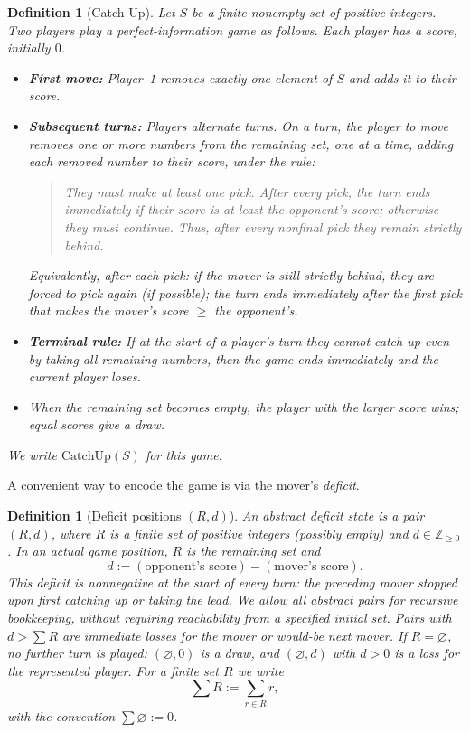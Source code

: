 \documentclass[11pt]{article}
\newtheorem{definition}[theorem]{Definition}
\newcommand{\CatchUp}{\mathrm{CatchUp}}
\begin{document}
\begin{definition}[Catch-Up]\label{def:catchup}
Let $S$ be a finite nonempty set of positive integers. Two players play a perfect-information game as follows.
Each player has a \emph{score}, initially $0$.

\begin{itemize}
\item \textbf{First move:} Player~1 removes \emph{exactly one} element of $S$ and adds it to their score.
\item \textbf{Subsequent turns:} Players alternate turns. On a turn, the player to move removes one or more
numbers from the remaining set, \emph{one at a time}, adding each removed number to their score, under the rule:
\begin{quote}
They must make at least one pick. After every pick, the turn ends immediately if their score is
\emph{at least} the opponent's score; otherwise they must continue. Thus, after every nonfinal pick
they remain \emph{strictly behind}.
\end{quote}
Equivalently, after each pick: if the mover is still strictly behind, they are forced to pick again (if possible);
the turn ends immediately after the first pick that makes the mover's score $\ge$ the opponent's.
\item \textbf{Terminal rule:} If at the start of a player's turn they cannot catch up even by taking \emph{all}
remaining numbers, then the game ends immediately and the current player loses.
\item When the remaining set becomes empty, the player with the larger score wins; equal scores give a draw.
\end{itemize}
We write $\CatchUp(S)$ for this game.
\end{definition}

A convenient way to encode the game is via the mover's \emph{deficit}.

\begin{definition}[Deficit positions $(R,d)$]\label{def:state}
An abstract \emph{deficit state} is a pair $(R,d)$, where $R$ is a finite set of positive integers
(possibly empty) and $d\in\mathbb Z_{\ge 0}$. In an actual game position, $R$ is the remaining set and
\[
d := (\text{opponent's score})-(\text{mover's score}).
\]
This deficit is nonnegative at the start of every turn: the preceding mover stopped upon first
catching up or taking the lead. We allow all abstract pairs for recursive bookkeeping, without
requiring reachability from a specified initial set. Pairs with $d>\sum R$ are immediate losses
for the mover or would-be next mover. If $R=\varnothing$, no further turn is played:
$(\varnothing,0)$ is a draw, and $(\varnothing,d)$ with $d>0$ is a loss for the represented player.
For a finite set $R$ we write
\[
\sum R := \sum_{r\in R} r,
\]
with the convention $\sum\varnothing:=0$.
\end{definition}
\end{document}
